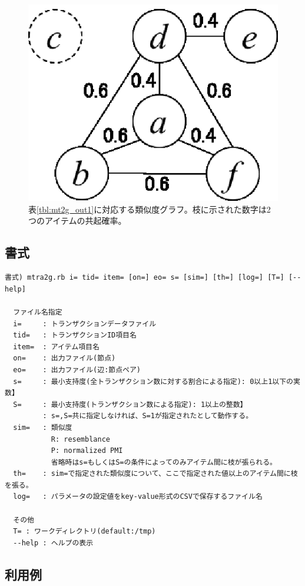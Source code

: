 \begin{figure}[htbp]
\begin{center}
\begin{minipage}{0.3\hsize}
\includegraphics[scale=0.6]{./simg.eps}
\caption{表\ref{tbl:mt2g_out1}に対応する類似度グラフ。枝に示された数字は2つのアイテムの共起確率。\label{fig:mt2g_out1}}
\end{minipage}
\end{center}
\end{figure}


\subsection{書式}
\begin{verbatim}
書式) mtra2g.rb i= tid= item= [on=] eo= s= [sim=] [th=] [log=] [T=] [--help]

  ファイル名指定
  i=     : トランザクションデータファイル
  tid=   : トランザクションID項目名
  item=  : アイテム項目名
  on=    : 出力ファイル(節点)
  eo=    : 出力ファイル(辺:節点ペア)
  s=     : 最小支持度(全トランザクション数に対する割合による指定): 0以上1以下の実数】
  S=     : 最小支持度(トランザクション数による指定): 1以上の整数】
         : s=,S=共に指定しなければ、S=1が指定されたとして動作する。
  sim=   : 類似度
           R: resemblance
           P: normalized PMI
           省略時はs=もしくはS=の条件によってのみアイテム間に枝が張られる。
  th=    : sim=で指定された類似度について、ここで指定された値以上のアイテム間に枝を張る。
  log=   : パラメータの設定値をkey-value形式のCSVで保存するファイル名

  その他
  T= : ワークディレクトリ(default:/tmp)
  --help : ヘルプの表示
\end{verbatim}

\subsection{利用例}



